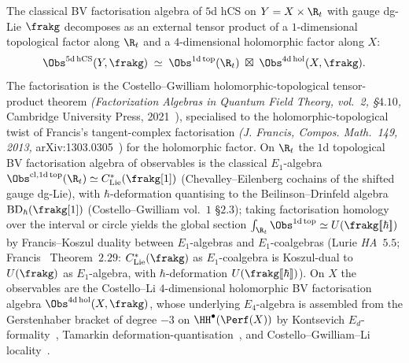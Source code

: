 \begin{proposition}
\label{prop:5d-hcs-bv-factorisation}
The classical BV factorisation algebra of $5$d hCS on $Y = X \times \R_t$ with gauge dg-Lie $\frakg$ decomposes as an external tensor product of a $1$-dimensional topological factor along $\R_t$ and a $4$-dimensional holomorphic factor along $X$:
\begin{equation}
\label{eq:obs-5d-hcs-factorisation}
 \Obs^{5\mathrm{d\,hCS}}(Y, \frakg) \;\simeq\;
 \Obs^{1\mathrm{d\,top}}(\R_t)
 \;\boxtimes\;
 \Obs^{4\mathrm{d\,hol}}(X, \frakg).
\end{equation}
The factorisation is the Costello--Gwilliam holomorphic-topological tensor-product theorem \emph{(Factorization Algebras in Quantum Field Theory, vol.~2, §$4.10$,} Cambridge University Press, 2021~\cite{CostelloGwilliam}), specialised to the holomorphic-topological twist of Francis's tangent-complex factorisation \emph{(J. Francis, Compos. Math.~149, 2013,} arXiv:1303.0305~\cite{Francis2013}) for the holomorphic factor. On $\R_t$ the $1$d topological BV factorisation algebra of observables is the classical $E_1$-algebra $\Obs^{\mathrm{cl}, 1\mathrm{d\,top}}(\R_t) \simeq C^*_{\mathrm{Lie}}(\frakg[1])$ \textup{(}Chevalley--Eilenberg cochains of the shifted gauge dg-Lie\textup{),} with $\hbar$-deformation quantising to the Beilinson--Drinfeld algebra $\mathrm{BD}_\hbar(\frakg[1])$ \textup{(}Costello--Gwilliam vol.~$1$ \S$2.3$\textup{);} taking factorisation homology over the interval or circle yields the global section $\int_{\R_t} \Obs^{1\mathrm{d\,top}} \simeq U(\frakg[\![\hbar]\!])$ by Francis--Koszul duality between $E_1$-algebras and $E_1$-coalgebras \textup{(}Lurie \emph{HA}~$5.5$; Francis~\cite{Francis2013} Theorem~$2.29$: $C^*_{\mathrm{Lie}}(\frakg)$ as $E_1$-coalgebra is Koszul-dual to $U(\frakg)$ as $E_1$-algebra, with $\hbar$-deformation $U(\frakg[\![\hbar]\!])$\textup{).} On $X$ the observables are the Costello--Li $4$-dimensional holomorphic BV factorisation algebra $\Obs^{4\mathrm{d\,hol}}(X, \frakg)$, whose underlying $E_4$-algebra is assembled from the Gerstenhaber bracket of degree $-3$ on $\HH^\bullet(\Perf(X))$ by Kontsevich $E_d$-formality~\cite{Kontsevich1999}, Tamarkin deformation-quantisation~\cite{Tamarkin2007}, and Costello--Gwilliam--Li locality~\cite{CostelloLi2020,CostelloGwilliam}.
\end{proposition}

